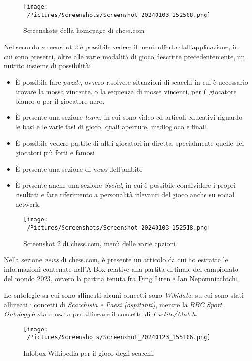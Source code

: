\documentclass[12pt]{book}
\begin{document}
\begin{figure}[h]
  \caption{Screenshots della homepage di chess.com}
  \centering
  \label{fig:chess.com_1}
  \texttt{[image: ~/Pictures/Screenshots/Screenshot\_20240103\_152508.png]}
\end{figure} 

Nel secondo screenshot \ref{fig:chess.com_2} è possibile vedere il
menù offerto dall'applicazione, in cui sono presenti, oltre alle varie
modalità di gioco descritte precedentemente, un nutrito insieme di
possibilità:
\begin{itemize}
  \item È possibile fare \textit{puzzle}, ovvero risolvere
    situazioni di scacchi in cui è necessario trovare la mossa
    vincente, o la sequenza di mosse vincenti, per il giocatore bianco
    o per il giocatore nero.
  \item È presente una sezione \textit{learn}, in cui sono video ed
    articoli educativi riguardo le basi e le varie fasi di gioco,
    quali aperture, mediogioco e finali.
  \item È possibile vedere partite di altri giocatori in diretta,
    specialmente quelle dei giocatori più forti e famosi
  \item È presente una sezione di \textit{news} dell'ambito
  \item È presente anche una sezione \textit{Social}, in cui è
    possibile condividere i propri risultati e fare riferimento a
    personalità rilevanti del gioco anche su social network.
\end{itemize}

\begin{figure}[h]
  \caption{Screenshot 2 di chess.com, menù delle varie opzioni.}
  \centering
  \label{fig:chess.com_2}
  \texttt{[image: ~/Pictures/Screenshots/Screenshot\_20240103\_152518.png]}
\end{figure}

Nella sezione \textit{news} di chess.com, è presente un articolo da
cui ho estratto le informazioni contenute nell'A-Box relative alla
partita di finale del campionato del mondo 2023, ovvero la partita
tenuta fra Ding Liren e Ian Nepomniachtchi.

Le ontologie su cui sono allineati alcuni concetti sono
\textit{Wikidata}, su cui sono stati allineati i concetti di
\textit{Scacchista e Paesi (ospitanti)}, mentre la \textit{BBC Sport
Ontology} è stata usata per allineare il concetto di
\textit{Partita/Match}.


\begin{figure}[h]
  \caption{Infobox Wikipedia per il gioco degli scacchi.}
  \centering
  \label{fig:infobox_wikipedia}
  \texttt{[image: ~/Pictures/Screenshots/Screenshot\_20240123\_155106.png]}
\end{figure} 
\end{document}
